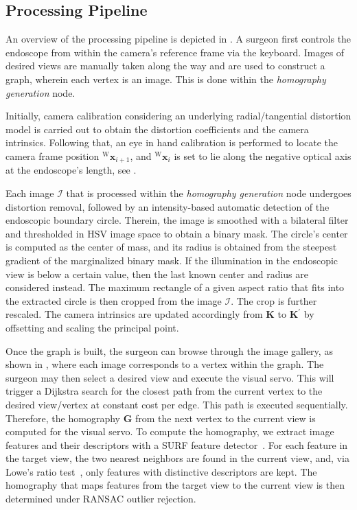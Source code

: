 \subsection{Processing Pipeline}
\label{c2:sec:pipe}

An overview of the processing pipeline is depicted in . A surgeon first controls the endoscope from within the camera's reference frame via the keyboard. Images of desired views are manually taken along the way and are used to construct a graph, wherein each vertex is an image. This is done within the \textit{homography generation} node. 

Initially, camera calibration considering an underlying radial/tangential distortion model is carried out to obtain the distortion coefficients and the camera intrinsics. Following that, an eye in hand calibration is performed to locate the camera frame position $^\text{W}\mathbf{x}_{i+1}$, and $^\text{W}\mathbf{x}_i$ is set to lie along the negative optical axis at the endoscope's length, see . 

Each image $\mathcal{I}$ that is processed within the \textit{homography generation} node undergoes distortion removal, followed by an intensity-based automatic detection of the endoscopic boundary circle. Therein, the image is smoothed with a bilateral filter and thresholded in HSV image space to obtain a binary mask. The circle's center is computed as the center of mass, and its radius is obtained from the steepest gradient of the marginalized binary mask. If the illumination in the endoscopic view is below a certain value, then the last known center and radius are considered instead. The maximum rectangle of a given aspect ratio that fits into the extracted circle is then cropped from the image $\mathcal{I}$. The crop is further rescaled. The camera intrinsics are updated accordingly from $\mathbf{K}$ to $\mathbf{K}^\prime$ by offsetting and scaling the principal point. 

Once the graph is built, the surgeon can browse through the image gallery, as shown in , where each image corresponds to a vertex within the graph. The surgeon may then select a desired view and execute the visual servo. This will trigger a Dijkstra search for the closest path from the current vertex to the desired view/vertex at constant cost per edge. This path is executed sequentially. Therefore, the homography $\mathbf{G}$ from the next vertex to the current view is computed for the visual servo. To compute the homography, we extract image features and their descriptors with a SURF feature detector~\cite{bay2006surf}. For each feature in the target view, the two nearest neighbors are found in the current view, and, via Lowe's ratio test~\cite{lowe2004distinctive}, only features with distinctive descriptors are kept. The homography that maps features from the target view to the current view is then determined under RANSAC outlier rejection.

